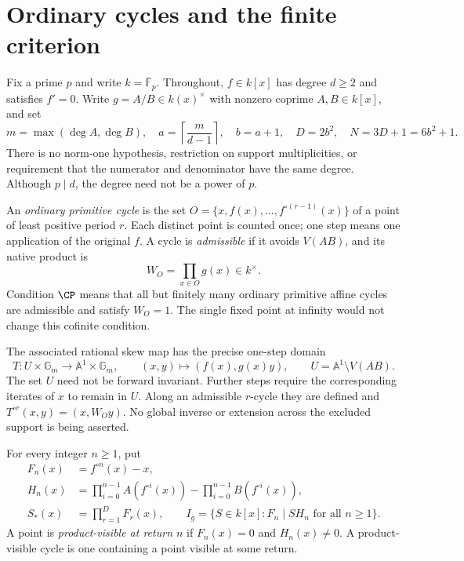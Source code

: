 \section{Ordinary cycles and the finite criterion}\label{sec:statement}

Fix a prime $p$ and write $k=\overline{\mathbb F}_p$. Throughout,
$f\in k[x]$ has degree $d\ge2$ and satisfies $f'=0$. Write
$g=A/B\in k(x)^\times$ with nonzero coprime $A,B\in k[x]$, and set
\begin{equation}\label{eq:constants}
 m=\max(\deg A,\deg B),\quad
 a=\left\lceil\frac{m}{d-1}\right\rceil,\quad b=a+1,\quad
 D=2b^2,\quad N=3D+1=6b^2+1.
\end{equation}
There is no norm-one hypothesis, restriction on support
multiplicities, or requirement that the numerator and denominator
have the same degree. Although $p\mid d$, the degree need not be a
power of $p$.

An \emph{ordinary primitive cycle} is the set
$O=\{x,f(x),\ldots,f^{\circ(r-1)}(x)\}$ of a point of least
positive period $r$. Each distinct point is counted once; one step
means one application of the original $f$. A cycle is
\emph{admissible} if it avoids $V(AB)$, and its native product is
\begin{equation}\label{eq:product}
 W_O=\prod_{x\in O}g(x)\in k^\times.
\end{equation}
Condition $\CP$ means that all but finitely many ordinary primitive
affine cycles are admissible and satisfy $W_O=1$. The single fixed
point at infinity would not change this cofinite condition.

The associated rational skew map has the precise one-step domain
\begin{equation}\label{eq:skew}
 T:U\times\mathbb G_m\longrightarrow\mathbb A^1\times\mathbb G_m,
 \qquad (x,y)\longmapsto(f(x),g(x)y),\qquad
 U=\mathbb A^1\setminus V(AB).
\end{equation}
The set $U$ need not be forward invariant. Further steps require
the corresponding iterates of $x$ to remain in $U$. Along an
admissible $r$-cycle they are defined and
$T^{\circ r}(x,y)=(x,W_Oy)$. No global inverse or extension across
the excluded support is being asserted.

For every integer $n\ge1$, put
\begin{align}
 F_n(x)&=f^{\circ n}(x)-x,\label{eq:F}\\
 H_n(x)&=\prod_{i=0}^{n-1}A(f^{\circ i}(x))
          -\prod_{i=0}^{n-1}B(f^{\circ i}(x)),\label{eq:H}\\
 S_*(x)&=\prod_{r=1}^{D}F_r(x),\qquad
 I_g=\{S\in k[x]: F_n\mid SH_n\text{ for all }n\ge1\}.
 \label{eq:ideal}
\end{align}
A point is \emph{product-visible at return $n$} if
$F_n(x)=0$ and $H_n(x)\ne0$. A product-visible cycle is one
containing a point visible at some return.

